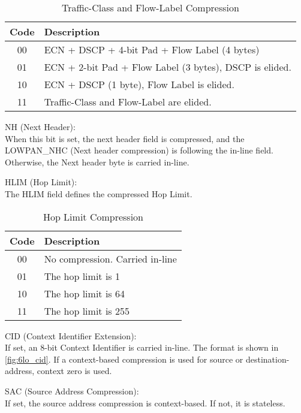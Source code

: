 \begin{table}[h!]
	\centering
	\caption{Traffic-Class and Flow-Label Compression}
	\begin{tabular}{|c|l|} \hline
	Code & Description                                           \\ \hline \hline
	00   & ECN + DSCP + 4-bit Pad + Flow Label (4 bytes)           \\ \hline
	01   & ECN + 2-bit Pad + Flow Label (3 bytes), DSCP is elided. \\ \hline
	10   & ECN + DSCP (1 byte), Flow Label is elided.              \\ \hline
	11   & Traffic-Class and Flow-Label are elided.                \\ \hline
	\end{tabular}
	\label{tab:6lo_tf}
\end{table}

NH (Next Header):\\
When this bit is set, the next header field is compressed, and the LOWPAN\_NHC (Next header compression) is following the in-line field.
Otherwise, the Next header byte is carried in-line.

HLIM (Hop Limit):\\
The HLIM field defines the compressed Hop Limit.

\begin{table}[h!]
	\centering
	\caption{Hop Limit Compression}
	\begin{tabular}{|c|l|} \hline
	Code & Description \\ \hline \hline
	00   & No compression. Carried in-line \\ \hline
	01   & The hop limit is 1              \\ \hline
	10   & The hop limit is 64             \\ \hline
	11   & The hop limit is 255            \\ \hline
	\end{tabular}
	\label{tab:6lo_hlim}
\end{table}

CID (Context Identifier Extension):\\
If set, an 8-bit Context Identifier is carried in-line. The format is shown in \autoref{fig:6lo_cid}.
If a context-based compression is used for source or destination-address, context zero is used.



SAC (Source Address Compression):\\
If set, the source address compression is context-based.
If not, it is stateless.

